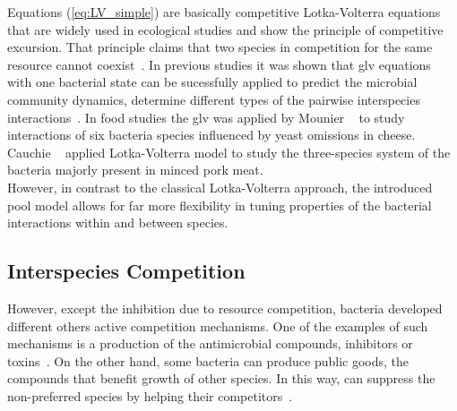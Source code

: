 \documentclass[10pt,A4paper]{article}
\begin{document}
%
Equations (\ref{eq:LV_simple}) are basically competitive Lotka-Volterra equations that are widely used in ecological studies and show the principle of competitive excursion.
That principle claims that two species in competition for the same resource cannot coexist~\cite{wangersky_lotka-volterra_1978}.
In previous studies it was shown that \ac{glv} equations with one bacterial state can be sucessfully applied to predict the microbial community dynamics, determine different types of the pairwise interspecies interactions~\cite{dedrick_when_2023, stein_ecological_2013, venturelli_deciphering_2018, hoffmann_power_2007}.
In food studies the \ac{glv} was applied by Mounier \etal~\cite{mounier_microbial_2008} to study interactions of six bacteria species influenced by yeast omissions in cheese.
Cauchie \etal~\cite{cauchie_modeling_2020} applied Lotka-Volterra model to study the three-species system of the bacteria majorly present in minced pork meat.\\
%
However, in contrast to the classical Lotka-Volterra approach, the introduced pool model allows for far more flexibility in tuning properties of the bacterial interactions within and between species.
%
%
%
\subsection{Interspecies Competition}
However, except the inhibition due to resource competition, bacteria developed different others active competition mechanisms.
One of the examples of such mechanisms is a production of the antimicrobial compounds, inhibitors or toxins~\cite{wloch-salamon_effect_2008, chao_structured_1981}.
On the other hand, some bacteria can produce public goods, the compounds that benefit growth of other species.
In this way, can suppress the non-preferred species by helping their competitors~\cite{hibbing_bacterial_2010}.
%
%
\end{document}
